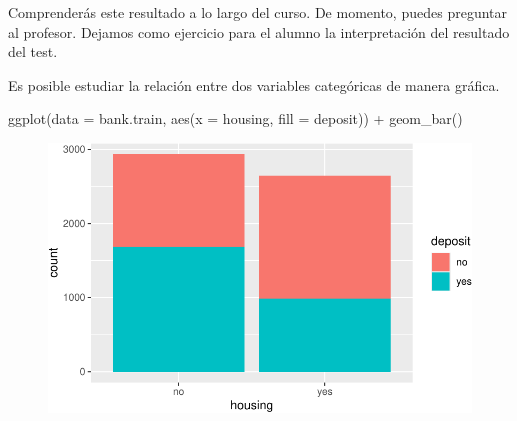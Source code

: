 \documentclass[
  letterpaper,
  DIV=11,
  numbers=noendperiod]{scrreprt}
\newenvironment{Shaded}{\begin{snugshade}}{\end{snugshade}}
\newcommand{\AttributeTok}[1]{\textcolor[rgb]{0.40,0.45,0.13}{#1}}
\newcommand{\FunctionTok}[1]{\textcolor[rgb]{0.28,0.35,0.67}{#1}}
\newcommand{\NormalTok}[1]{\textcolor[rgb]{0.00,0.23,0.31}{#1}}
\newcommand{\SpecialCharTok}[1]{\textcolor[rgb]{0.37,0.37,0.37}{#1}}
\begin{document}
\begin{tcolorbox}[enhanced jigsaw, arc=.35mm, breakable, coltitle=black, left=2mm, opacityback=0, bottomtitle=1mm, colbacktitle=quarto-callout-caution-color!10!white, title=\textcolor{quarto-callout-caution-color}{\faFire}\hspace{0.5em}{Ejercicio}, titlerule=0mm, colback=white, colframe=quarto-callout-caution-color-frame, bottomrule=.15mm, rightrule=.15mm, opacitybacktitle=0.6, toptitle=1mm, toprule=.15mm, leftrule=.75mm]

Comprenderás este resultado a lo largo del curso. De momento, puedes
preguntar al profesor. Dejamos como ejercicio para el alumno la
interpretación del resultado del test.

\end{tcolorbox}

Es posible estudiar la relación entre dos variables categóricas de
manera gráfica.

\begin{Shaded}
\begin{Highlighting}[]
\FunctionTok{ggplot}\NormalTok{(}\AttributeTok{data =}\NormalTok{ bank.train, }\FunctionTok{aes}\NormalTok{(}\AttributeTok{x =}\NormalTok{ housing, }\AttributeTok{fill =}\NormalTok{ deposit)) }\SpecialCharTok{+}
    \FunctionTok{geom\_bar}\NormalTok{()}
\end{Highlighting}
\end{Shaded}

\begin{figure}[H]

{\centering \includegraphics{eda_files/figure-pdf/unnamed-chunk-27-1.pdf}

}

\end{figure}
\end{document}
